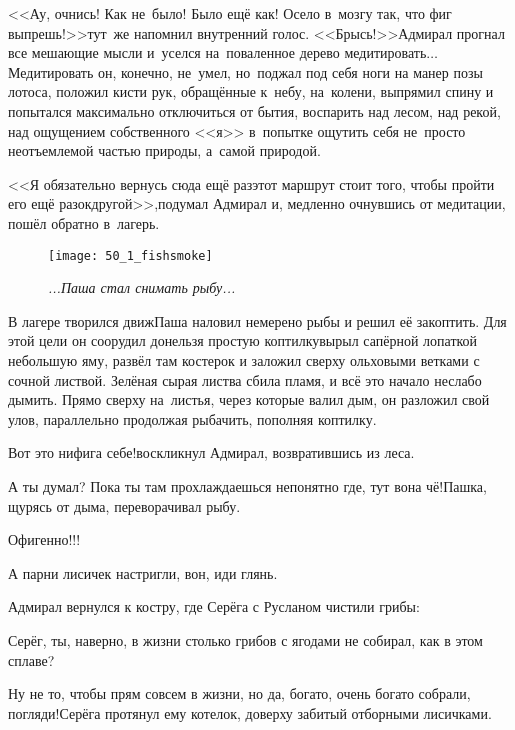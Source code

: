 <<Ау, очнись! Как не~было! Было ещё как! Осело в~мозгу так, что фиг выпрешь!>>\mdash тут~же напомнил внутренний голос. <<Брысь!>>\mdash Адмирал прогнал все мешающие мысли и~уселся на~поваленное дерево медитировать$\ldots$ Медитировать он, конечно, не~умел, но~поджал под себя ноги на манер позы лотоса, положил кисти рук, обращённые к~небу, на~колени, выпрямил спину и попытался максимально отключиться от бытия, воспарить над лесом, над рекой, над ощущением собственного <<я>> в~попытке ощутить себя не~просто неотъемлемой частью природы, а~самой природой.

<<Я обязательно вернусь сюда ещё раз\mdash этот маршрут стоит того, чтобы пройти его ещё разок\sdash другой>>,\mdash подумал Адмирал и, медленно очнувшись от медитации, пошёл обратно в~лагерь.


\newpage

\begin{wrapfigure}[22]{l}{0.58\textwidth}
	\centering
	\texttt{[image: 50\_1\_fishsmoke]}
	\caption{\small\textit{...Паша стал снимать рыбу...}}
\end{wrapfigure}
В лагере творился движ\mdash Паша наловил немерено рыбы и решил её закоптить. Для этой цели он соорудил донельзя простую коптилку\mdash вырыл сапёрной лопаткой небольшую яму, развёл там костерок и заложил сверху ольховыми ветками с сочной листвой. Зелёная сырая листва сбила пламя, и всё это начало неслабо дымить. Прямо сверху на~листья, через которые валил дым, он разложил свой улов, параллельно продолжая рыбачить, пополняя коптилку.

\diagdash Вот это нифига себе!\mdash воскликнул Адмирал, возвратившись из леса.

\diagdash А ты думал? Пока ты там прохлаждаешься непонятно где, тут вона чё!\mdash Пашка, щурясь от дыма, переворачивал рыбу.

\diagdash Офигенно!!!

\diagdash А парни лисичек настригли, вон, иди глянь.

Адмирал вернулся к костру, где Серёга с Русланом чистили грибы:

\diagdash Серёг, ты, наверно, в жизни столько грибов с ягодами не собирал, как в этом сплаве?

\diagdash Ну не то, чтобы прям совсем в жизни, но да, богато, очень богато собрали, погляди!\mdash Серёга протянул ему котелок, доверху забитый отборными лисичками.

